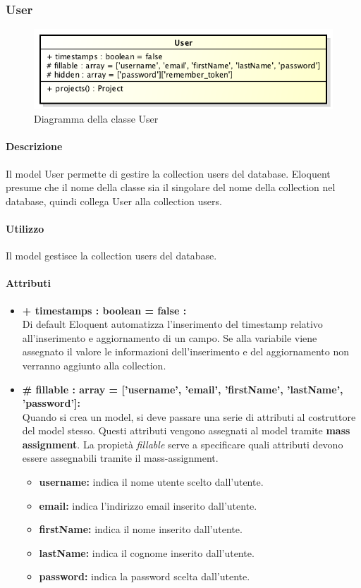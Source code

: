 \subsubsection{User}

	\begin{figure}[h]
		\centering
		\includegraphics[width=0.5\linewidth]{img/User}
		\caption[Diagramma della classe User]{Diagramma della classe User}
	\end{figure}

	\paragraph{Descrizione}
	Il model User permette di gestire la collection users del database. Eloquent presume che il nome della classe sia il singolare del nome della collection nel database, quindi collega User alla collection users.

	\paragraph{Utilizzo}
	Il model gestisce la collection users del database.
	
	\paragraph{Attributi}
	\begin{itemize}
		\item \textbf{+ timestamps : boolean = false :}\\
		Di default Eloquent automatizza l'inserimento del timestamp relativo all'inserimento e aggiornamento di un campo. Se alla variabile viene assegnato il valore le informazioni dell'inserimento e del aggiornamento non verranno aggiunto alla collection.
		\item \textbf{\# fillable : array = ['username', 'email', 'firstName', 'lastName', 'password']:}\\
		Quando si crea un model, si deve passare una serie di attributi al costruttore del model stesso. Questi attributi vengono assegnati al model tramite \textbf{mass assignment}. La propietà \textit{fillable} serve a specificare quali attributi devono essere assegnabili tramite il mass-assignment.
		\begin{itemize}
			\item \textbf{username:} indica il nome utente scelto dall'utente.
			\item \textbf{email:} indica l'indirizzo email inserito dall'utente.
			\item \textbf{firstName:} indica il nome inserito dall'utente.
			\item \textbf{lastName:} indica il cognome inserito dall'utente.
			\item \textbf{password:} indica la password scelta dall'utente.
		\end{itemize}
	\end{itemize}
	
